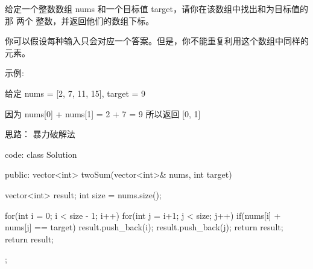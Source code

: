 给定一个整数数组 nums 和一个目标值 target，请你在该数组中找出和为目标值的那 两个 整数，并返回他们的数组下标。

你可以假设每种输入只会对应一个答案。但是，你不能重复利用这个数组中同样的元素。

示例:

给定 nums = [2, 7, 11, 15], target = 9

因为 nums[0] + nums[1] = 2 + 7 = 9
所以返回 [0, 1]


思路：
暴力破解法



















code:
class Solution {
public:
    vector<int> twoSum(vector<int>& nums, int target) {
        vector<int> result;
        int size = nums.size();
        
        for(int i = 0; i < size - 1; i++)
        {
            for(int j = i+1; j < size; j++)
            {
                if(nums[i] + nums[j] == target)
                {
                    result.push_back(i);
                    result.push_back(j);
                    return result;
                }
            }
        }
        return result;
    }
};